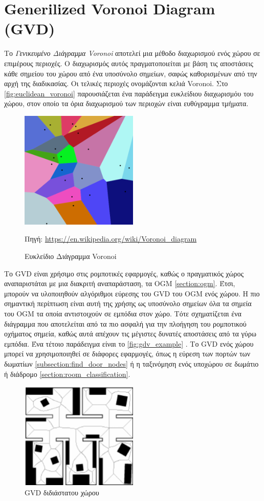 \section{Generilized Voronoi Diagram (GVD)}
\label{section:gvd}


Το \emph{Γενικευμένο Διάγραμμα Voronoi} αποτελεί μια μέθοδο διαχωρισμού ενός χώρου σε επιμέρους περιοχές. Ο διαχωρισμός αυτός πραγματοποιείται με βάση τις αποστάσεις κάθε σημείου του χώρου από ένα υποσύνολο σημείων, σαφώς καθορισμένων από την αρχή της διαδικασίας. Οι τελικές περιοχές ονομάζονται κελιά Voronoi.
Στο \autoref{fig:euclidean_voronoi} παρουσιάζεται ένα παράδειγμα ευκλείδιου διαχωρισμόυ του χώρου, στον οποίο τα όρια διαχωρισμού των περιοχών είναι ευθύγραμμα τμήματα. 

\begin{figure}
    \centering
    \includegraphics[width=0.5\textwidth]{./images/chapter3/Euclidean_Voronoi_diagram.png}
    \caption{Ευκλείδιο Διάγραμμα Voronoi}
    Πηγή: \href{https://en.wikipedia.org/wiki/Voronoi\_diagram}{https://en.wikipedia.org/wiki/Voronoi\_diagram}
    \label{fig:euclidean_voronoi}
\end{figure}

Το GVD είναι χρήσιμο στις ρομποτικές εφαρμογές, καθώς ο πραγματικός χώρος αναπαριστάται με μια διακριτή αναπαράσταση, τα OGM \ref{section:ogm}. Έτσι, μπορούν να υλοποιηθούν αλγόριθμοι εύρεσης του GVD του OGM ενός χώρου. Η πιο σημαντική περίπτωση είναι αυτή της χρήσης ως υποσύνολο σημείων όλα τα σημεία του OGM τα οποία αντιστοιχούν σε εμπόδια στον χώρο. Τότε σχηματίζεται ένα διάγραμμα που αποτελείται από τα πιο ασφαλή για την πλοήγηση του ρομποτικού οχήματος σημεία, καθώς αυτά απέχουν τις μέγιστες δυνατές αποστάσεις από τα γύρω εμπόδια. Ένα τέτοιο παράδειγμα είναι το \autoref{fig:gdv_example} \cite{wallgruen2009}. Το GVD ενός χώρου μπορεί να χρησιμοποιηθεί σε διάφορες εφαρμογές, όπως η εύρεση των πορτών των δωματίων \ref{subsection:find_door_nodes} ή η ταξινόμηση ενός υποχώρου σε δωμάτιο ή διάδρομο \ref{section:room_classification}.

\begin{figure}
    \centering
    \includegraphics[width=0.5\textwidth]{./images/chapter3/gvd.png}
    \caption{GVD διδιάστατου χώρου}
    \label{fig:gdv_example}
\end{figure}
